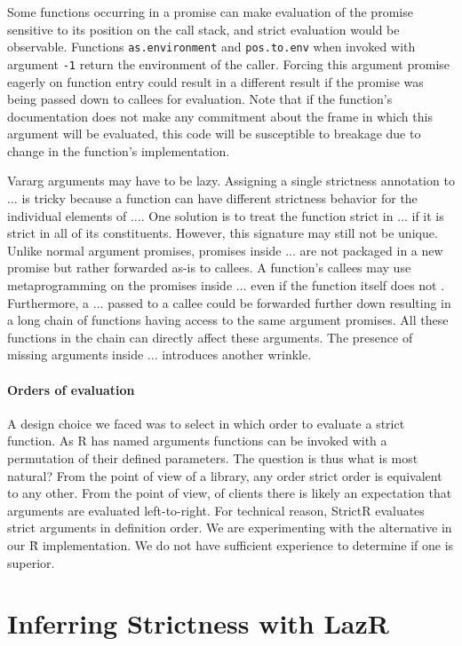 \documentclass[review,nonacm,screen,acmsmall,anonymous=true]{acmart}
\newcommand{\code}[1]{\lstinline |#1|\xspace}
\newcommand{\strictr}{{\sf StrictR}\xspace}
\renewcommand{\Rsh}{{\sf\u R}\xspace}
\begin{document}
Some functions occurring in a promise can make evaluation of the promise
sensitive to its position on the call stack, and strict evaluation would be
observable. Functions \code{as.environment} and \code{pos.to.env} when invoked
with argument \code{-1} return the environment of the caller. Forcing this
argument promise eagerly on function entry could result in a different result if
the promise was being passed down to callees for evaluation. Note that if the
function's documentation does not make any commitment about the frame in which
this argument will be evaluated, this code will be susceptible to breakage due
to change in the function's implementation.

Vararg arguments may have to be lazy. Assigning a single strictness annotation
to $\dots$ is tricky because a function can have different strictness behavior
for the individual elements of $\dots$. One solution is to treat the function
strict in $\dots$ if it is strict in all of its constituents. However, this
signature may still not be unique. Unlike normal argument promises, promises
inside $\dots$ are not packaged in a new promise but rather forwarded as-is to
callees. A function's callees may use metaprogramming on the promises inside
$\dots$ even if the function itself does not . Furthermore, a $...$ passed to a
callee could be forwarded further down resulting in a long chain of functions
having access to the same argument promises. All these functions in the chain
can directly affect these arguments. The presence of missing arguments inside
$...$ introduces another wrinkle.

\paragraph{Orders of evaluation} A design choice we faced was to select
in which order to evaluate a strict function. As R has named arguments functions
can be invoked with a permutation of their defined parameters. The question is
thus what is most natural? From the point of view of a library, any order strict
order is equivalent to any other. From the point of view, of clients there is
likely an expectation that arguments are evaluated left-to-right. For technical
reason, \strictr evaluates strict arguments in definition order. We are
experimenting with the alternative in our \Rsh implementation. We do not have
sufficient experience to determine if one is superior.


\section{Inferring Strictness with LazR}
\end{document}
